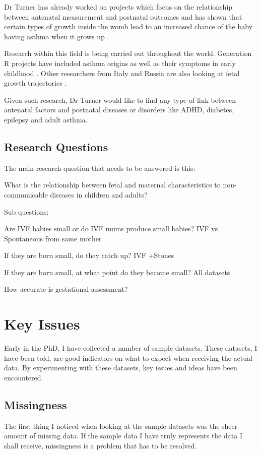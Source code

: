\documentclass[bsc]{abdnthesis}
\begin{document}
Dr Turner has already worked on projects which focus on the relationship between antenatal measurement and postnatal outcomes and has shown that certain types of growth inside the womb lead to an increased chance of the baby having asthma when it grows up \cite{turner1}. 

Research within this field is being carried out throughout the world. Generation R projects have included asthma origins \cite{ generation-r} as well as their symptoms in early childhood \cite{ generation-r2}. Other researchers from Italy and Russia are also looking at fetal growth trajectories \cite{luccia1, luccia2, luccia3, luccia4}. 

Given such research, Dr Turner would like to find any type of link between antenatal factors and postnatal diseases or disorders like ADHD, diabetes, epilepsy and adult asthma. 

\section{Research Questions} %
\label{sec:research_questions}
The main research question that needs to be answered is this:

\centerline{What is the relationship between fetal and maternal characteristics to non-communicable diseases in children and adults?}

Sub questions:

Are IVF babies small or do IVF mums produce small babies? IVF vs Spontaneous from same mother

If they are born small, do they catch up? IVF +Stones​

If they are born small, at what point do they become small? All datasets

How accurate is gestational assessment? 


\chapter{Key Issues}
Early in the PhD, I have collected a number of sample datasets. These datasets, I have been told, are good indicators on what to expect when receiving the actual data. By experimenting with these datasets, key issues and ideas have been encountered. 
\section{Missingness} %
\label{sec:missingness}
The first thing I noticed when looking at the sample datasets was the sheer amount of missing data. If the sample data I have truly represents the data I shall receive, missingness is a problem that has to be resolved. 
\end{document}
